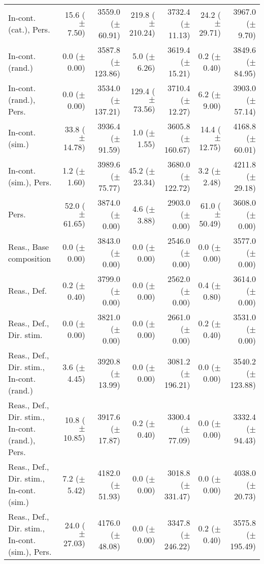 \begin{table*}
\begin{tabular}{lrrrrrr}
        In-cont. (cat.), Pers. & 15.6 ($\pm$ 7.50) & 3559.0 ($\pm$ 60.91) & 219.8 ($\pm$ 210.24) & 3732.4 ($\pm$ 11.13) & 24.2 ($\pm$ 29.71) & 3967.0 ($\pm$ 9.70) \\
        In-cont. (rand.) & 0.0 ($\pm$ 0.00) & 3587.8 ($\pm$ 123.86) & 5.0 ($\pm$ 6.26) & 3619.4 ($\pm$ 15.21) & 0.2 ($\pm$ 0.40) & 3849.6 ($\pm$ 84.95) \\
        In-cont. (rand.), Pers. & 0.0 ($\pm$ 0.00) & 3534.0 ($\pm$ 137.21) & 129.4 ($\pm$ 73.56) & 3710.4 ($\pm$ 12.27) & 6.2 ($\pm$ 9.00) & 3903.0 ($\pm$ 57.14) \\
        In-cont. (sim.) & 33.8 ($\pm$ 14.78) & 3936.4 ($\pm$ 91.59) & 1.0 ($\pm$ 1.55) & 3605.8 ($\pm$ 160.67) & 14.4 ($\pm$ 12.75) & 4168.8 ($\pm$ 60.01) \\
        In-cont. (sim.), Pers. & 1.2 ($\pm$ 1.60) & 3989.6 ($\pm$ 75.77) & 45.2 ($\pm$ 23.34) & 3680.0 ($\pm$ 122.72) & 3.2 ($\pm$ 2.48) & 4211.8 ($\pm$ 29.18) \\
        Pers. & 52.0 ($\pm$ 61.65) & 3874.0 ($\pm$ 0.00) & 4.6 ($\pm$ 3.88) & 2903.0 ($\pm$ 0.00) & 61.0 ($\pm$ 50.49) & 3608.0 ($\pm$ 0.00) \\
        Reas., Base composition & 0.0 ($\pm$ 0.00) & 3843.0 ($\pm$ 0.00) & 0.0 ($\pm$ 0.00) & 2546.0 ($\pm$ 0.00) & 0.0 ($\pm$ 0.00) & 3577.0 ($\pm$ 0.00) \\
        Reas., Def. & 0.2 ($\pm$ 0.40) & 3799.0 ($\pm$ 0.00) & 0.0 ($\pm$ 0.00) & 2562.0 ($\pm$ 0.00) & 0.4 ($\pm$ 0.80) & 3614.0 ($\pm$ 0.00) \\
        Reas., Def., Dir. stim. & 0.0 ($\pm$ 0.00) & 3821.0 ($\pm$ 0.00) & 0.0 ($\pm$ 0.00) & 2661.0 ($\pm$ 0.00) & 0.2 ($\pm$ 0.40) & 3531.0 ($\pm$ 0.00) \\
        Reas., Def., Dir. stim., In-cont. (rand.) & 3.6 ($\pm$ 4.45) & 3920.8 ($\pm$ 13.99) & 0.0 ($\pm$ 0.00) & 3081.2 ($\pm$ 196.21) & 0.0 ($\pm$ 0.00) & 3540.2 ($\pm$ 123.88) \\
        Reas., Def., Dir. stim., In-cont. (rand.), Pers. & 10.8 ($\pm$ 10.85) & 3917.6 ($\pm$ 17.87) & 0.2 ($\pm$ 0.40) & 3300.4 ($\pm$ 77.09) & 0.0 ($\pm$ 0.00) & 3332.4 ($\pm$ 94.43) \\
        Reas., Def., Dir. stim., In-cont. (sim.) & 7.2 ($\pm$ 5.42) & 4182.0 ($\pm$ 51.93) & 0.0 ($\pm$ 0.00) & 3018.8 ($\pm$ 331.47) & 0.0 ($\pm$ 0.00) & 4038.0 ($\pm$ 20.73) \\
        Reas., Def., Dir. stim., In-cont. (sim.), Pers. & 24.0 ($\pm$ 27.03) & 4176.0 ($\pm$ 48.08) & 0.0 ($\pm$ 0.00) & 3347.8 ($\pm$ 246.22) & 0.2 ($\pm$ 0.40) & 3575.8 ($\pm$ 195.49) \\

\end{tabular}
\end{table*}
